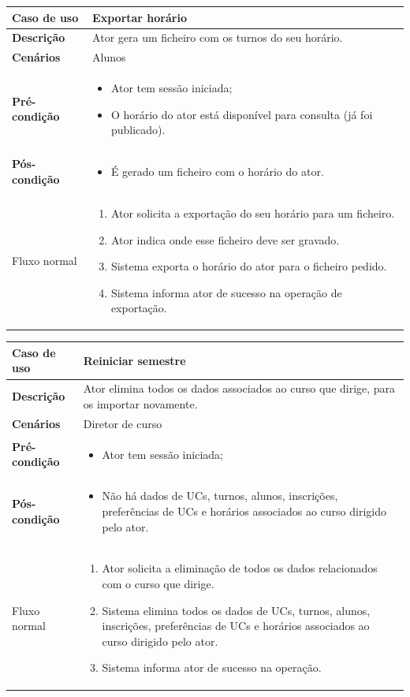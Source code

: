 \documentclass[12pt, a4paper]{article}
\newenvironment{condition}{
    \begin{itemize}[wide=0pt]
        \vspace{-0.2cm}
}{
        \vspace{-0.5cm}
    \end{itemize}
}
\newcommand\flow[1]{
    Fluxo normal &
    \singlespacing
    \begin{enumerate}[wide=0pt]
        #1
        \vspace{-0.3cm}
    \end{enumerate} \\ \hline
}
\newenvironment{usecase}[5]{
    \begin{table}[H]
        \centering
        \begin{tabular}{|>{\centering\arraybackslash\bf}m{3cm}|m{13cm}|}
            \hline
            Caso de uso & \textbf{#1} \\

            \hline
            Descrição & #2 \\

            \hline
            Cenários & #3 \\

            \hline
            Pré-condição &
            \begin{condition}
                #4
            \end{condition} \\

            \hline
            Pós-condição &
            \begin{condition}
                #5
            \end{condition} \\

            \hline
}{
    \end{tabular}
\end{table}
}
\begin{document}
\begin{usecase}
    {Exportar horário}
    {Ator gera um ficheiro com os turnos do seu horário.}
    {Alunos}
    {
        \item Ator tem sessão iniciada;
        \item O horário do ator está disponível para consulta (já foi publicado).
    }
    {\item É gerado um ficheiro com o horário do ator.}

    \flow{
        \item Ator solicita a exportação do seu horário para um ficheiro.
        \item Ator indica onde esse ficheiro deve ser gravado.
        \item Sistema exporta o horário do ator para o ficheiro pedido.
        \item Sistema informa ator de sucesso na operação de exportação.
    }
\end{usecase}

\begin{usecase}
    {Reiniciar semestre}
    {Ator elimina todos os dados associados ao curso que dirige, para os importar novamente.}
    {Diretor de curso}
    {\item Ator tem sessão iniciada;}
    {
        \item Não há dados de UCs, turnos, alunos, inscrições, preferências de UCs e horários
            associados ao curso dirigido pelo ator.
    }

    \flow{
        \item Ator solicita a eliminação de todos os dados relacionados com o curso que dirige.
        \item Sistema elimina todos os dados de UCs, turnos, alunos, inscrições, preferências de UCs
            e horários associados ao curso dirigido pelo ator.
        \item Sistema informa ator de sucesso na operação.
    }
\end{usecase}
\end{document}
